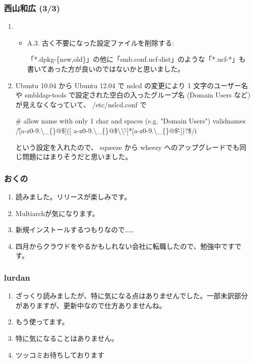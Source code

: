 \documentclass[cjk,dvipdfmx,10pt,compress,%
hyperref={bookmarks=true,bookmarksnumbered=true,bookmarksopen=false,%
colorlinks=false,%
pdftitle={第 71 回 関西 Debian 勉強会},%
pdfauthor={倉敷・のがた・佐々木・かわだ・八津尾},%
pdfsubject={資料},%
}]{beamer}
\begin{document}
\begin{frame}
  \frametitle{ 西山和広 (3/3)}
  \begin{enumerate}
  \item 
    \begin{itemize}
    \item %
      A.3. 古く不要になった設定ファイルを削除する:

      「*.dpkg-\{new,old\}」の他に「smb.conf.ucf-dist」のような「*.ucf-*」も書いてあった方が良いのではないかと思いました。
    \end{itemize}
    \setcounter{enumi}{2}
  \item %
    Ubuntu 10.04 から Ubuntu 12.04 で nslcd の変更により 1 文字のユーザー名や smbldap-tools で設定された空白の入ったグループ名 (Domain Users など) が見えなくなっていて、 /etc/nslcd.conf で

\# allow name with only 1 char and spaces (e.g. "Domain Users")
validnames  /\^[a-z0-9.\textbackslash\_\{\}@\$]([ a-z0-9.\textbackslash\_\{\}@\$\textbackslash\textbackslash\~-]*[a-z0-9.\textbackslash\_\{\}@\$\~-])?\$/i

    \noindent
    という設定を入れたので、 squeeze から wheezy へのアップグレードでも同じ問題にはまりそうだと思いました。
  \end{enumerate}
\end{frame}

\begin{frame}
  \frametitle{ おくの }
  \begin{enumerate}
  \item %
    読みました。リリースが楽しみです。
  \item %
    Multiarchが気になります。
  \item %
    新規インストールするつもりなので……
  \item %
    四月からクラウドをやるかもしれない会社に転職したので、勉強中ですです。
  \end{enumerate}
\end{frame}

\begin{frame}
  \frametitle{ lurdan }
  \begin{enumerate}
  \item %
   ざっくり読みましたが、特に気になる点はありませんでした。一部未訳部分がありますが、更新中なので仕方ありませんね。
 \item %
   もう使ってます。
 \item %
   特に気になることはありません。
 \item %
   ツッコミお待ちしております
 \end{enumerate}
\end{frame}
\end{document}
